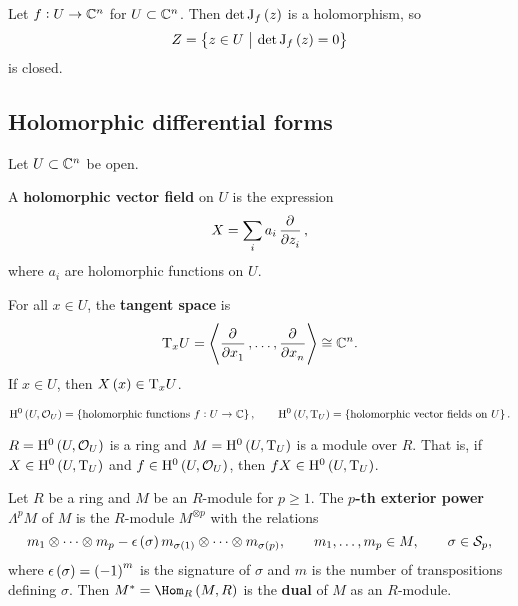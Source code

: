 \begin{remark}
Let $ f : U \to \mathbb{C}^n $ for $ U \subset \mathbb{C}^n $. Then $ \det \J_f\br{z} $ is a holomorphism, so
$$ Z = \cbr{z \in U \st \det \J_f\br{z} = 0} $$
is closed.
\end{remark}

\subsection{Holomorphic differential forms}

Let $ U \subset \mathbb{C}^n $ be open.

\begin{definition}
A \textbf{holomorphic vector field} on $ U $ is the expression
$$ X = \sum_i a_i\dpd{}{z_i}, $$
where $ a_i $ are holomorphic functions on $ U $.
\end{definition}

For all $ x \in U $, the \textbf{tangent space} is
$$ \T_xU = \abr{\dpd{}{x_1}, \dots, \dpd{}{x_n}} \cong \CC^n. $$
If $ x \in U $, then $ X\br{x} \in \T_xU $.

\begin{notation}
$$ \H^0\br{U, \OOO_U} = \cbr{\text{holomorphic functions} \ f : U \to \CC}, \qquad \H^0\br{U, \T_U} = \cbr{\text{holomorphic vector fields on} \ U}. $$
\end{notation}

\begin{remark*}
$ R = \H^0\br{U, \OOO_U} $ is a ring and $ M = \H^0\br{U, \T_U} $ is a module over $ R $. That is, if $ X \in \H^0\br{U, \T_U} $ and $ f \in \H^0\br{U, \OOO_U} $, then $ fX \in \H^0\br{U, \T_U} $.
\end{remark*}

\pagebreak

\begin{definition}
Let $ R $ be a ring and $ M $ be an $ R $-module for $ p \ge 1 $. The \textbf{$ p $-th exterior power} $ \Lambda^pM $ of $ M $ is the $ R $-module $ M^{\otimes p} $ with the relations
$$ m_1 \otimes \dots \otimes m_p - \epsilon\br{\sigma}m_{\sigma\br{1}} \otimes \dots \otimes m_{\sigma\br{p}}, \qquad m_1, \dots, m_p \in M, \qquad \sigma \in \SSS_p, $$
where $ \epsilon\br{\sigma} = \br{-1}^m $ is the signature of $ \sigma $ and $ m $ is the number of transpositions defining $ \sigma $. Then $ M^* = \Hom_R\br{M, R} $ is the \textbf{dual} of $ M $ as an $ R $-module.
\end{definition}


